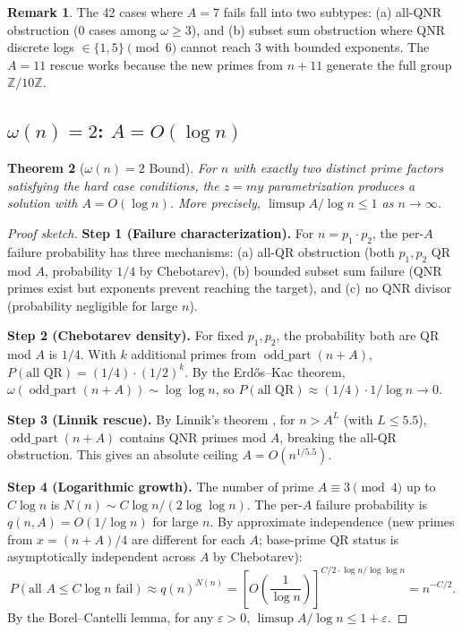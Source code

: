 \documentclass[11pt,a4paper]{article}
\theoremstyle{plain}
\newtheorem{theorem}{Theorem}[section]
\theoremstyle{plain}
\theoremstyle{definition}
\newtheorem{remark}[theorem]{Remark}
\numberwithin{equation}{section}
\begin{document}
\begin{remark}
The 42 cases where $A = 7$ fails fall into two subtypes: (a) all-QNR obstruction (0 cases among $\omega \geq 3$), and (b) subset sum obstruction where QNR discrete logs $\in \{1, 5\} \pmod{6}$ cannot reach $3$ with bounded exponents. The $A = 11$ rescue works because the new primes from $n + 11$ generate the full group $\mathbb{Z}/10\mathbb{Z}$.
\end{remark}

\subsection{\texorpdfstring{$\omega(n) = 2$}{omega(n) = 2}: \texorpdfstring{$A = O(\log n)$}{A = O(log n)}}

\begin{theorem}[$\omega(n) = 2$ Bound]\label{thm:omega2}
For $n$ with exactly two distinct prime factors satisfying the hard case conditions, the $z = my$ parametrization produces a solution with $A = O(\log n)$. More precisely, $\limsup A/\log n \leq 1$ as $n \to \infty$.
\end{theorem}

\begin{proof}[Proof sketch]
\textbf{Step 1 (Failure characterization).} For $n = p_1 \cdot p_2$, the per-$A$ failure probability has three mechanisms: (a) all-QR obstruction (both $p_1, p_2$ QR mod $A$, probability $1/4$ by Chebotarev), (b) bounded subset sum failure (QNR primes exist but exponents prevent reaching the target), and (c) no QNR divisor (probability negligible for large $n$).

\textbf{Step 2 (Chebotarev density).} For fixed $p_1, p_2$, the probability both are QR mod $A$ is $1/4$. With $k$ additional primes from $\operatorname{odd\_part}(n+A)$, $P(\text{all QR}) = (1/4) \cdot (1/2)^k$. By the Erd\H{o}s--Kac theorem, $\omega(\operatorname{odd\_part}(n+A)) \sim \log\log n$, so $P(\text{all QR}) \approx (1/4) \cdot 1/\log n \to 0$.

\textbf{Step 3 (Linnik rescue).} By Linnik's theorem \cite{Xylouris2011}, for $n > A^L$ (with $L \leq 5.5$), $\operatorname{odd\_part}(n+A)$ contains QNR primes mod $A$, breaking the all-QR obstruction. This gives an absolute ceiling $A = O(n^{1/5.5})$.

\textbf{Step 4 (Logarithmic growth).} The number of prime $A \equiv 3 \pmod{4}$ up to $C \log n$ is $N(n) \sim C\log n / (2\log\log n)$. The per-$A$ failure probability is $q(n, A) = O(1/\log n)$ for large $n$. By approximate independence (new primes from $x = (n+A)/4$ are different for each $A$; base-prime QR status is asymptotically independent across $A$ by Chebotarev):
\begin{equation}
P(\text{all } A \leq C\log n \text{ fail}) \approx q(n)^{N(n)} = \left[O\!\left(\frac{1}{\log n}\right)\right]^{C/2 \cdot \log n / \log\log n} = n^{-C/2}.
\end{equation}
By the Borel--Cantelli lemma, for any $\varepsilon > 0$, $\limsup A/\log n \leq 1 + \varepsilon$.
\end{proof}
\end{document}
